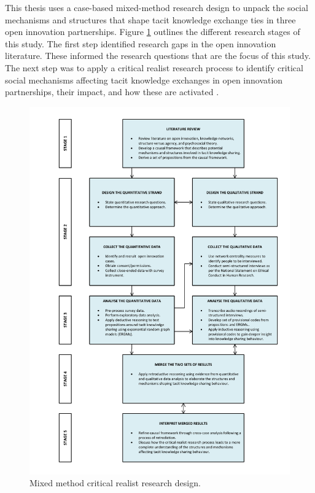 This thesis uses a case-based mixed-method research design to unpack the social mechanisms and structures that shape tacit knowledge exchange ties in three open innovation partnerships. Figure \ref{fig:mm} outlines the different research stages of this study. The first step identified research gaps in the open innovation literature. These informed the research questions that are the focus of this study. The next step was to apply a critical realist research process to identify critical social mechanisms affecting tacit knowledge exchanges in open innovation partnerships, their impact, and how these are activated \citep{mcavoy2018critical}. \medskip

\begin{figure}[p]
\centering
\includegraphics[width = 1.0\textwidth]{Images/mm.pdf}
\caption[Mixed method research design]{Mixed method critical realist research design.}
\label{fig:mm}
\end{figure}

